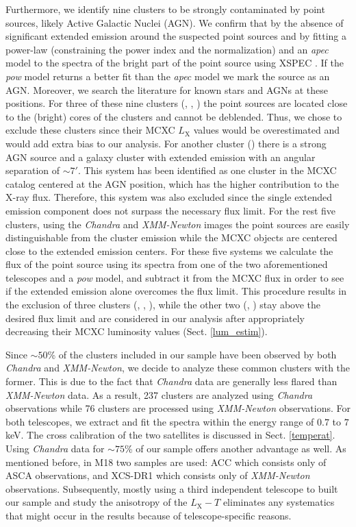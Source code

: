 \documentclass{aa}   %
\begin{document}
Furthermore, we identify nine clusters to be strongly contaminated by point sources, likely Active Galactic Nuclei (AGN). We confirm that by the absence of significant extended emission around the suspected point sources and by fitting a power-law (constraining the power index and the normalization) and an \textit{apec} model to the spectra of the bright part of the point source using XSPEC \citep{xspec}. If the \textit{pow} model returns a better fit than the \textit{apec} model we mark the source as an AGN. Moreover, we search the literature for known stars and AGNs at these positions. For three of these nine clusters (, , ) the point sources are located close to the (bright) cores of the clusters and cannot be deblended. Thus, we chose to exclude these clusters since their MCXC $L_{\text{X}}$ values would be overestimated and would add extra bias to our analysis. For another cluster () there is a strong AGN source and a galaxy cluster with extended emission with an angular separation of $\sim 7'$. This system has been identified as one cluster in the MCXC catalog centered at the AGN position, which has the higher contribution to the X-ray flux. Therefore, this system was also excluded since the single extended emission component does not surpass the necessary flux limit. For the rest five clusters, using the \textit{Chandra} and \textit{XMM-Newton} images the point sources are easily distinguishable from the cluster emission while the MCXC objects are centered close to the extended emission centers. For these five systems we calculate the flux of the point source using its spectra from one of the two aforementioned telescopes and a \textit{pow} model, and subtract it from the MCXC flux in order to see if the extended emission alone overcomes the flux limit. This procedure results in the exclusion of three clusters (, , ), while the other two (, ) stay above the desired flux limit and are considered in our analysis after appropriately decreasing their MCXC luminosity values (Sect. \ref{lum_estim}). 

Since $\sim 50$\% of the clusters included in our sample have been observed by both \textit{Chandra} and \textit{XMM-Newton}, we decide to analyze these common clusters with the former. This is due to the fact that \textit{Chandra} data are generally less flared than \textit{XMM-Newton} data. As a result, 237 clusters are analyzed using \textit{Chandra} observations while 76 clusters are processed using \textit{XMM-Newton} observations. For both telescopes, we extract and fit the spectra within the energy range of  $0.7$ to $7$ keV. The cross calibration of the two satellites is discussed in Sect. \ref{temperat}.
Using \textit{Chandra} data for $\sim 75$\% of our sample offers another advantage as well. As mentioned before, in M18 two samples are used: ACC which consists only of ASCA observations, and XCS-DR1 which consists only of \textit{XMM-Newton} observations. Subsequently, mostly using a third independent telescope to built our sample and study the anisotropy of the $L_{\text{X}}-T$ eliminates any systematics that might occur in the results because of telescope-specific reasons.
\end{document}
